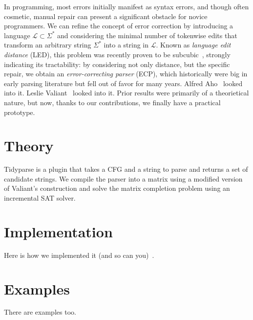 \documentclass[sigplan,nonacm]{acmart}\settopmatter{printfolios=false,printccs=false,printacmref=false}
\begin{document}
In programming, most errors initially manifest as syntax errors, and though often cosmetic, manual repair can present a significant obstacle for novice programmers. We can refine the concept of error correction by introducing a language $\mathcal{L} \subset \Sigma^*$ and considering the minimal number of tokenwise edits that transform an arbitrary string $\Sigma^*$ into a string in $\mathcal{L}$. Known as \textit{language edit distance} (LED), this problem was recently proven to be subcubic~\cite{bringmann2019truly}, strongly indicating its tractability: by considering not only distance, but the specific repair, we obtain an \textit{error-correcting parser} (ECP), which historically were big in early parsing literature but fell out of favor for many years. Alfred Aho~\cite{aho1972minimum} looked into it. Leslie Valiant~\cite{valiant1975general} looked into it. Prior results were primarily of a theorietical nature, but now, thanks to our contributions, we finally have a practical prototype.

%


\section{Theory}

Tidyparse is a plugin that takes a CFG and a string to parse and returns a set of candidate strings. We compile the parser into a matrix using a modified version of Valiant's construction and solve the matrix completion problem using an incremental SAT solver.

\section{Implementation}
    Here is how we implemented it (and so can you)~\cite{valiant1975general}.
\section{Examples}
    There are examples too.

\end{document}
